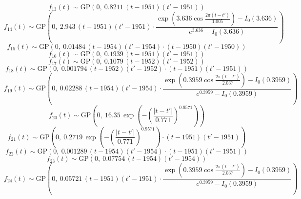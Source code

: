 \documentclass[11pt,a4paper]{article}
\begin{document}
\begin{dmath*}
f_{13}(t) \sim \mathrm{GP}\!\left(0,\ 0.8211\,(t - 1951)(t' - 1951)\right)
\end{dmath*}
\begin{dmath*}
f_{14}(t) \sim \mathrm{GP}\!\left(0,\ 2.943\,(t - 1951)(t' - 1951) \cdot \frac{\exp\!\left(3.636\cos\frac{2\pi (t - t')}{1.005}\right) - I_0(3.636)}{e^{3.636} - I_0(3.636)}\right)
\end{dmath*}
\begin{dmath*}
f_{15}(t) \sim \mathrm{GP}\!\left(0,\ 0.01484\,(t - 1954)(t' - 1954) \cdot (t - 1950)(t' - 1950)\right)
\end{dmath*}
\begin{dmath*}
f_{16}(t) \sim \mathrm{GP}\!\left(0,\ 0.1939\,(t - 1951)(t' - 1951)\right)
\end{dmath*}
\begin{dmath*}
f_{17}(t) \sim \mathrm{GP}\!\left(0,\ 0.1079\,(t - 1952)(t' - 1952)\right)
\end{dmath*}
\begin{dmath*}
f_{18}(t) \sim \mathrm{GP}\!\left(0,\ 0.001794\,(t - 1952)(t' - 1952) \cdot (t - 1951)(t' - 1951)\right)
\end{dmath*}
\begin{dmath*}
f_{19}(t) \sim \mathrm{GP}\!\left(0,\ 0.02288\,(t - 1954)(t' - 1954) \cdot \frac{\exp\!\left(0.3959\cos\frac{2\pi (t - t')}{2.037}\right) - I_0(0.3959)}{e^{0.3959} - I_0(0.3959)}\right)
\end{dmath*}
\begin{dmath*}
f_{20}(t) \sim \mathrm{GP}\!\left(0,\ 16.35\,\exp\!\left(-\left(\frac{|t - t'|}{0.771}\right)^{0.9571}\right)\right)
\end{dmath*}
\begin{dmath*}
f_{21}(t) \sim \mathrm{GP}\!\left(0,\ 0.2719\,\exp\!\left(-\left(\frac{|t - t'|}{0.771}\right)^{0.9571}\right) \cdot (t - 1951)(t' - 1951)\right)
\end{dmath*}
\begin{dmath*}
f_{22}(t) \sim \mathrm{GP}\!\left(0,\ 0.001289\,(t - 1954)(t' - 1954) \cdot (t - 1951)(t' - 1951)\right)
\end{dmath*}
\begin{dmath*}
f_{23}(t) \sim \mathrm{GP}\!\left(0,\ 0.07754\,(t - 1954)(t' - 1954)\right)
\end{dmath*}
\begin{dmath*}
f_{24}(t) \sim \mathrm{GP}\!\left(0,\ 0.05721\,(t - 1951)(t' - 1951) \cdot \frac{\exp\!\left(0.3959\cos\frac{2\pi (t - t')}{2.037}\right) - I_0(0.3959)}{e^{0.3959} - I_0(0.3959)}\right)
\end{dmath*}
\end{document}
